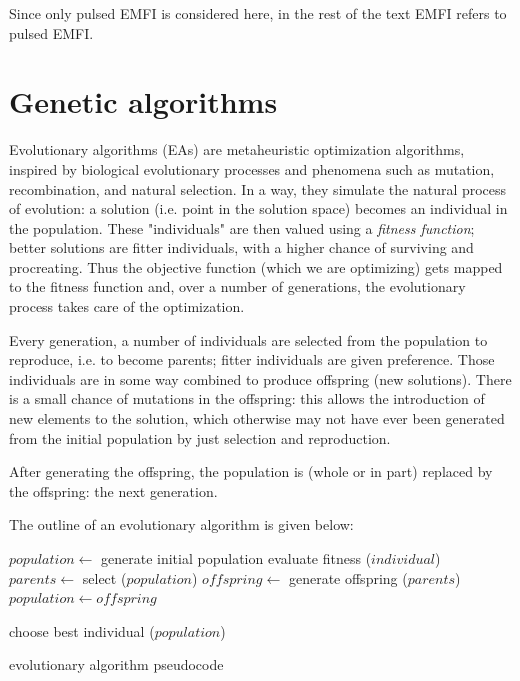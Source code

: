 \documentclass[times, utf8, diplomski]{fer}
\begin{document}
Since only pulsed EMFI is considered here, in the rest of the text EMFI refers
to pulsed EMFI.


\section{Genetic algorithms}\label{sec:GAs}
Evolutionary algorithms (EAs) are metaheuristic optimization algorithms,
inspired by biological evolutionary processes and phenomena such as mutation,
recombination, and natural selection.
In a way, they simulate the natural process of evolution: a solution
(i.e. point in the solution space) becomes an individual in the population.
These "individuals" are then valued using a \emph{fitness function}; better
solutions are fitter individuals, with a higher chance of surviving and procreating.
Thus the objective function (which we are optimizing) gets mapped to the fitness function
and, over a number of generations, the evolutionary process takes care of the optimization.

Every generation, a number of individuals are selected from the population to
reproduce, i.e. to become parents; fitter individuals are given preference.
Those individuals are in some way combined to produce offspring (new solutions).
There is a small chance of mutations in the offspring: this allows the introduction
of new elements to the solution, which otherwise may not have ever been generated
from the initial population by just selection and reproduction.

After generating the offspring, the population is (whole or in part) replaced
by the offspring: the next generation.

The outline of an evolutionary algorithm is given below:
\begin{algorithm}[h]\label{algo:evolutionary}
    \begin{algorithmic}
        \STATE $\mathit{population} \gets$ generate initial population
        \REPEAT
                \STATE evaluate fitness ($\mathit{individual}$)
            \ENDFOR
            \STATE $\mathit{parents}    \gets$ select ($\mathit{population}$)
            \STATE $\mathit{offspring}  \gets$ generate offspring ($\mathit{parents}$)
            \STATE $\mathit{population} \gets  \mathit{offspring}$


        \RETURN choose best individual ($population$)
    \end{algorithmic}
    \caption{evolutionary algorithm pseudocode}
\end{algorithm}
\end{document}
